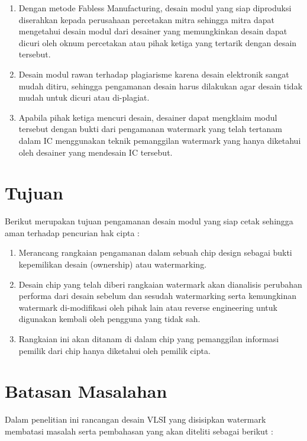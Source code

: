 \begin{enumerate}
	\item Dengan metode Fabless Manufacturing, desain modul yang siap diproduksi diserahkan kepada perusahaan percetakan mitra sehingga mitra dapat mengetahui desain modul dari desainer yang	memungkinkan desain dapat dicuri oleh oknum percetakan atau pihak	ketiga yang tertarik dengan desain tersebut.
	
	\item Desain modul rawan terhadap plagiarisme karena desain elektronik sangat mudah ditiru, sehingga pengamanan desain harus dilakukan agar desain tidak mudah untuk dicuri atau di-plagiat.
	
	\item Apabila pihak ketiga mencuri desain, desainer dapat mengklaim modul tersebut dengan bukti dari pengamanan watermark yang telah tertanam dalam IC menggunakan teknik pemanggilan watermark yang hanya diketahui oleh desainer yang mendesain IC tersebut.
\end{enumerate}

\section{Tujuan}
Berikut merupakan tujuan pengamanan desain modul yang siap cetak sehingga aman terhadap pencurian hak cipta :
\begin{enumerate}
	\item Merancang rangkaian pengamanan dalam sebuah chip design sebagai bukti kepemilikan desain (ownership) atau watermarking.
	
	\item Desain chip yang telah diberi rangkaian watermark akan dianalisis perubahan performa dari desain sebelum dan sesudah watermarking serta kemungkinan watermark di-modifikasi oleh pihak lain atau reverse engineering untuk digunakan kembali oleh pengguna yang tidak	sah.
	
	\item Rangkaian ini akan ditanam di dalam chip yang pemanggilan informasi pemilik dari chip hanya diketahui oleh pemilik cipta.
\end{enumerate}

\section{Batasan Masalahan}
Dalam penelitian ini rancangan desain VLSI yang disisipkan watermark membatasi masalah serta pembahasan yang akan diteliti sebagai berikut :

